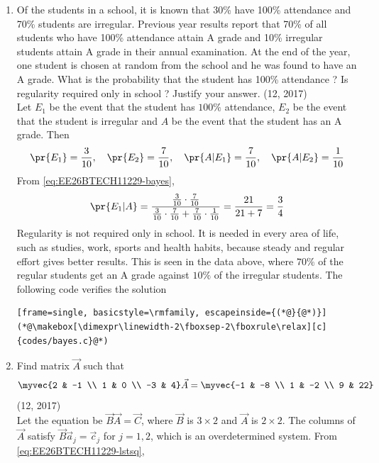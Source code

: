 \begin{enumerate}[label=\thesubsection.\arabic*, ref=\thesubsection.\theenumi]
\item 
Of the students in a school, it is known that 30\% have 100\% attendance and 70\% students are irregular. Previous year results report that 70\% of all students who have 100\% attendance attain A grade and 10\% irregular students attain A grade in their annual examination. At the end of the year, one student is chosen at random from the school and he was found to have an A grade. What is the probability that the student has 100\% attendance ? Is regularity required only in school ? Justify your answer.
\hfill (12, 2017)
\\
\solution
Let $E_1$ be the event that the student has $100\%$ attendance, $E_2$ be the event that the student is irregular and $A$ be the event that the student has an A grade. Then
\begin{align}
	\pr{E_1} = \frac{3}{10}, \quad \pr{E_2} = \frac{7}{10}, \quad \pr{A|E_1} = \frac{7}{10}, \quad \pr{A|E_2} = \frac{1}{10}
\end{align}
From \eqref{eq:EE26BTECH11229-bayes},
\begin{align}
	\pr{E_1|A} = \frac{\frac{3}{10}\cdot\frac{7}{10}}{\frac{3}{10}\cdot\frac{7}{10} + \frac{7}{10}\cdot\frac{1}{10}}
	= \frac{21}{21 + 7} = \frac{3}{4}
\end{align}
Regularity is not required only in school. It is needed in every area of life, such as studies, work, sports and health habits, because steady and regular effort gives better results. This is seen in the data above, where $70\%$ of the regular students get an A grade against $10\%$ of the irregular students.
The following code verifies the solution
\begin{lstlisting}[frame=single, basicstyle=\rmfamily, escapeinside={(*@}{@*)}]
(*@\makebox[\dimexpr\linewidth-2\fboxsep-2\fboxrule\relax][c]{codes/bayes.c}@*)
\end{lstlisting}
\item 
Find matrix $\vec{A}$ such that
\begin{align*}
	\myvec{2 & -1 \\ 1 & 0 \\ -3 & 4}\vec{A} = \myvec{-1 & -8 \\ 1 & -2 \\ 9 & 22}
\end{align*}
\hfill (12, 2017)
\\
\solution
Let the equation be $\vec{B}\vec{A} = \vec{C}$, where $\vec{B}$ is $3 \times 2$ and $\vec{A}$ is $2 \times 2$. The columns of $\vec{A}$ satisfy $\vec{B}\vec{a}_j = \vec{c}_j$ for $j = 1, 2$, which is an overdetermined system. From \eqref{eq:EE26BTECH11229-lstsq},

\end{enumerate}
